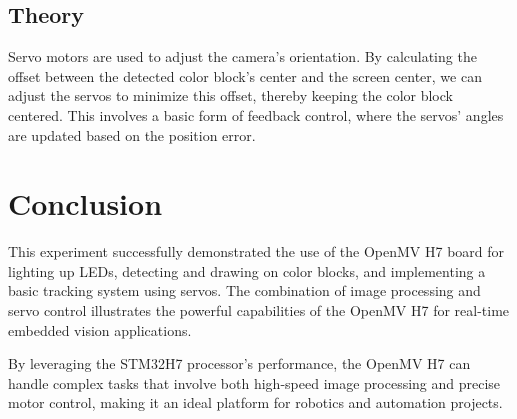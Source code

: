 \documentclass{article}
\begin{document}
\subsection{Theory}
Servo motors are used to adjust the camera's orientation. By calculating the offset between the detected color block's center and the screen center, we can adjust the servos to minimize this offset, thereby keeping the color block centered. This involves a basic form of feedback control, where the servos' angles are updated based on the position error.

\section{Conclusion}
This experiment successfully demonstrated the use of the OpenMV H7 board for lighting up LEDs, detecting and drawing on color blocks, and implementing a basic tracking system using servos. The combination of image processing and servo control illustrates the powerful capabilities of the OpenMV H7 for real-time embedded vision applications.

By leveraging the STM32H7 processor's performance, the OpenMV H7 can handle complex tasks that involve both high-speed image processing and precise motor control, making it an ideal platform for robotics and automation projects.
\end{document}
